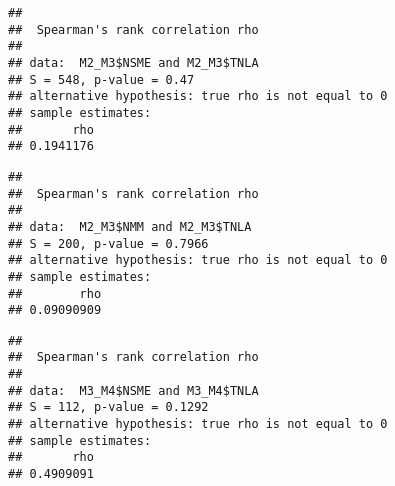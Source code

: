 \documentclass[]{article}
\newenvironment{Shaded}{\begin{snugshade}}{\end{snugshade}}
\newcommand{\KeywordTok}[1]{\textcolor[rgb]{0.13,0.29,0.53}{\textbf{{#1}}}}
\newcommand{\DataTypeTok}[1]{\textcolor[rgb]{0.13,0.29,0.53}{{#1}}}
\newcommand{\StringTok}[1]{\textcolor[rgb]{0.31,0.60,0.02}{{#1}}}
\newcommand{\CommentTok}[1]{\textcolor[rgb]{0.56,0.35,0.01}{\textit{{#1}}}}
\newcommand{\OtherTok}[1]{\textcolor[rgb]{0.56,0.35,0.01}{{#1}}}
\newcommand{\NormalTok}[1]{{#1}}
\begin{document}
\begin{verbatim}
## 
##  Spearman's rank correlation rho
## 
## data:  M2_M3$NSME and M2_M3$TNLA
## S = 548, p-value = 0.47
## alternative hypothesis: true rho is not equal to 0
## sample estimates:
##       rho 
## 0.1941176
\end{verbatim}

\begin{Shaded}
\end{Shaded}

\begin{verbatim}
## 
##  Spearman's rank correlation rho
## 
## data:  M2_M3$NMM and M2_M3$TNLA
## S = 200, p-value = 0.7966
## alternative hypothesis: true rho is not equal to 0
## sample estimates:
##        rho 
## 0.09090909
\end{verbatim}

\begin{Shaded}
\end{Shaded}

\begin{verbatim}
## 
##  Spearman's rank correlation rho
## 
## data:  M3_M4$NSME and M3_M4$TNLA
## S = 112, p-value = 0.1292
## alternative hypothesis: true rho is not equal to 0
## sample estimates:
##       rho 
## 0.4909091
\end{verbatim}

\begin{Shaded}
\end{Shaded}
\end{document}
